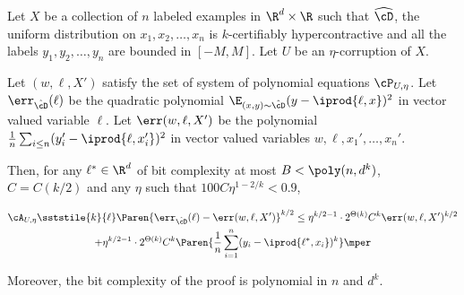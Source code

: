 \newcommand{\U}{\mathcal{U}}
\begin{lemma}

Let $X$ be a collection of $n$ labeled examples in $\R^d\times \R$ such that $\widehat{\cD}$, the uniform distribution on  $x_1, x_2, \ldots, x_n$ is $k$-certifiably hypercontractive and all the labels $y_1, y_2, \ldots, y_n$ are bounded in $[-M,M]$. Let $U$ be an $\eta$-corruption of $X$.

Let $(w,\ell,X')$ satisfy the set of system of polynomial equations $\cP_{U,\eta}$. Let $\err_{\hat{\cD}}(\ell)$ be the quadratic polynomial $\E_{(x,y) \sim \hat{\cD}} (y - \iprod{\ell,x})^2$ in vector valued variable $\ell$. Let $\err(w,\ell,X')$ be the polynomial $\frac{1}{n} \sum_{i \leq n} (y'_i - \iprod{\ell, x'_i})^2$ in vector valued variables $w,\ell,x_1',\ldots,x_n'$.

Then, for any $\ell^{*} \in \R^d$ of bit complexity at most $B < \poly(n,d^k)$, $C = C(k/2)$ and any $\eta$ such that $ 100 C \eta^{1-2/k} < 0.9$, 
 





\begin{multline}
\cA_{U,\eta} \sststile{k}{\ell} \Paren{\err_{\hat{\cD}}(\ell) - \err(w,\ell,X')}^{k/2}  \leq \eta^{k/2-1} \cdot 2^{\Theta(k)} C^{k} \err(w,\ell,X')^{k/2} \\+ \eta^{k/2-1} \cdot 2^{\Theta(k)} C^{k} \Paren{ \frac{1}{n} \sum_{i =1}^n (y_i-\iprod{\ell^{*},x_i})^{k}}  \mper
\end{multline}

Moreover, the bit complexity of the proof is polynomial in $n$ and $d^k$.





\end{lemma}
